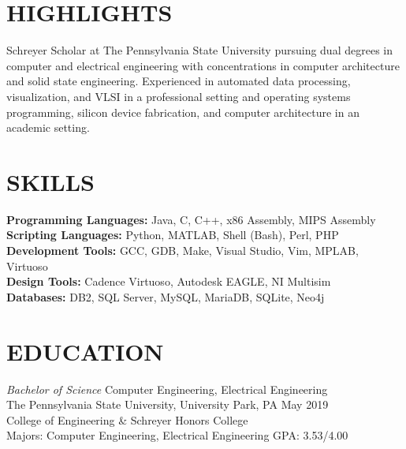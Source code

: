 \documentclass[line,margin]{res}
\begin{document}
	\address{235 S. Buckhout St. State College, PA 16801}
	\address{Cellphone: (484) 904-2099}
	
	\begin{resume}
		
		\section{HIGHLIGHTS} Schreyer Scholar at The Pennsylvania State University pursuing dual degrees in computer and electrical engineering with concentrations in computer architecture and solid state engineering.  Experienced in automated data processing, visualization, and VLSI in a professional setting and operating systems programming, silicon device fabrication, and computer architecture in an academic setting. 
		
		\section{SKILLS}
		\textbf{Programming Languages:} Java, C, C++, x86 Assembly, MIPS Assembly\\
		\textbf{Scripting Languages:} Python, MATLAB, Shell (Bash), Perl, PHP\\
		\textbf{Development Tools:} GCC, GDB, Make, Visual Studio, Vim, MPLAB, Virtuoso\\
		\textbf{Design Tools:} Cadence Virtuoso, Autodesk  EAGLE, NI Multisim\\
		\textbf{Databases:} DB2, SQL Server, MySQL, MariaDB, SQLite, Neo4j
		
		\section{EDUCATION}{\sl Bachelor of Science} Computer Engineering, Electrical Engineering \\
		The Pennsylvania State University, University Park, PA \hfill May 2019\\
		College of Engineering \& Schreyer Honors College\\
		Majors: Computer Engineering, Electrical Engineering \hfill GPA: 3.53/4.00
		

\end{resume}
\end{document}
